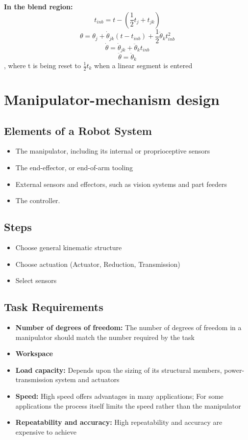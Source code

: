 \documentclass[10pt,a4paper]{article}
\begin{document}
\textbf{In the blend region:} \\
$$
	t_{inb} = t - (\frac 1 2 t_j + t_{jk})
$$
$$
	\theta = \theta_j + \dot \theta_{jk}(t - t_{inb}) + \frac 1 2 \ddot \theta_k t_{inb}^2
$$
$$
	\dot \theta = \dot \theta_{jk} + \ddot \theta_k t_{inb}
$$
$$
	\ddot \theta = \ddot \theta_k
$$
, where t is being reset to $\frac 1 2 t_k$ when a linear segment is entered

\section{Manipulator-mechanism design}
\subsection{Elements of a Robot System}
\begin{itemize}
	\item The manipulator, including its internal or proprioceptive sensors
	\item The end-effector, or end-of-arm tooling
	\item External sensors and effectors, such as vision systems and part feeders
	\item The controller.	
\end{itemize}

\subsection{Steps}
\begin{itemize}
	\item Choose general kinematic structure
	\item Choose actuation (Actuator, Reduction, Transmission)
	\item Select sensors
\end{itemize}

\subsection{Task Requirements}
\begin{itemize}
	\item \textbf{Number of degrees of freedom:} The number of degrees of freedom in a manipulator should match the number required by the task
	\item \textbf{Workspace}
	\item \textbf{Load capacity:} Depends upon the sizing of its structural members, power-transmission system and actuators
	\item \textbf{Speed:} High speed offers advantages in many applications; For some applications the process itself limits the speed rather than the manipulator
	\item \textbf{Repeatability and accuracy:} High repeatability and accuracy are expensive to achieve
\end{itemize}
\end{document}
